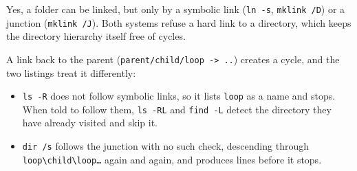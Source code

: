 
Yes, a folder can be linked, but only by a symbolic link (\texttt{ln -s},
\texttt{mklink /D}) or a junction (\texttt{mklink /J}). Both systems refuse a
hard link to a directory, which keeps the directory hierarchy itself free of
cycles.

A link back to the parent (\texttt{parent/child/loop -> ..}) creates a cycle,
and the two listings treat it differently:
\begin{itemize}
  \item \texttt{ls -R} does not follow symbolic links, so it lists
    \texttt{loop} as a name and stops. When told to follow them,
    \texttt{ls -RL} and \texttt{find -L} detect the directory they have already
    visited and skip it.
  \item \texttt{dir /s} follows the junction with no such check, descending
    through \texttt{loop\textbackslash child\textbackslash loop\ldots} again and
    again, and produces \winDirLines{} lines before it stops.
\end{itemize}
